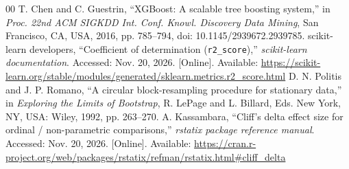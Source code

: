 \documentclass[conference,a4paper]{IEEEtran}
\begin{document}
\begin{thebibliography}{00}
T. Chen and C. Guestrin, “XGBoost: A scalable tree boosting system,”
in \textit{Proc. 22nd ACM SIGKDD Int. Conf. Knowl. Discovery Data Mining}, San Francisco, CA, USA, 2016,
pp. 785--794, doi: 10.1145/2939672.2939785.
scikit-learn developers, “Coefficient of determination (\texttt{r2\_score}),”
\textit{scikit-learn documentation}. Accessed: Nov. 20, 2026. [Online]. Available:
\url{https://scikit-learn.org/stable/modules/generated/sklearn.metrics.r2_score.html}
D. N. Politis and J. P. Romano, “A circular block-resampling procedure for stationary data,”
in \textit{Exploring the Limits of Bootstrap}, R. LePage and L. Billard, Eds.
New York, NY, USA: Wiley, 1992, pp. 263--270.
A. Kassambara, “Cliff's delta effect size for ordinal / non-parametric comparisons,”
\textit{rstatix package reference manual}. Accessed: Nov. 20, 2026. [Online]. Available:
\url{https://cran.r-project.org/web/packages/rstatix/refman/rstatix.html#cliff_delta}
\end{thebibliography}
\end{document}
